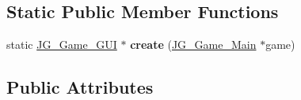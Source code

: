 \subsection*{Static Public Member Functions}
\begin{DoxyCompactItemize}
\item 
\hypertarget{class_j_g___game___g_u_i_a6559bb4b5a6c66faea5ac4c1e6ccc13b}{static \hyperlink{class_j_g___game___g_u_i}{J\-G\-\_\-\-Game\-\_\-\-G\-U\-I} $\ast$ {\bfseries create} (\hyperlink{class_j_g___game___main}{J\-G\-\_\-\-Game\-\_\-\-Main} $\ast$game)}\label{class_j_g___game___g_u_i_a6559bb4b5a6c66faea5ac4c1e6ccc13b}

\end{DoxyCompactItemize}
\subsection*{Public Attributes}
